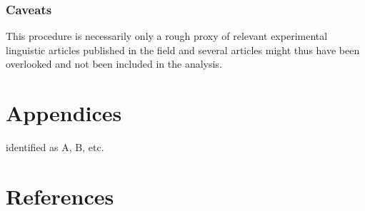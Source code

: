\documentclass[]{elsarticle} %
\begin{document}
\hypertarget{caveats}{%
\subsubsection{Caveats}\label{caveats}}

This procedure is necessarily only a rough proxy of relevant
experimental linguistic articles published in the field and several
articles might thus have been overlooked and not been included in the
analysis.

\hypertarget{appendices}{%
\section{Appendices}\label{appendices}}

identified as A, B, etc.

\hypertarget{references}{%
\section*{References}\label{references}}
\end{document}
